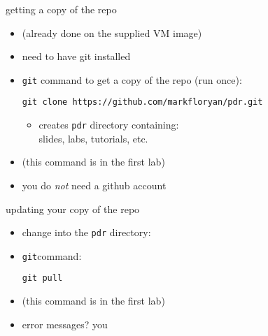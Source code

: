 \begin{frame}[fragile,label=repoCopy]{getting a copy of the repo}
    \begin{itemize}
        \item (already done on the supplied VM image)
        \item need to have git installed
        \item {\tt git} command to get a copy of the repo (run once): \\
\begin{framed}
\begin{lstlisting}[language={},basicstyle=\sourcecodepro\fontsize{10.5}{11.5}\selectfont]
git clone https://github.com/markfloryan/pdr.git
\end{lstlisting}
\end{framed}
            \begin{itemize}
                \item creates {\tt pdr} directory containing: \\
                        slides, labs, tutorials, etc.
            \end{itemize}
        \item (this command is in the first lab)
        \item you do \textit{not} need a github account
    \end{itemize}
\end{frame}

\begin{frame}{updating your copy of the repo}
    \begin{itemize}
        \item change into the {\tt pdr} directory: \\
        \item {\tt git}command: \\ \begin{framed}{\tt git pull}\end{framed}
        \item (this command is in the first lab)
        \item error messages? you 
    \end{itemize}
\end{frame}

